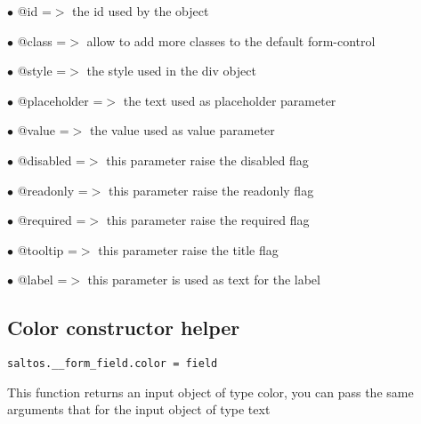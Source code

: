 \documentclass[a4paper]{book}
\begin{document}
\begin{compactitem}
\item[\color{myblue}$\bullet$] @id          =$>$ the id used by the object
\item[\color{myblue}$\bullet$] @class       =$>$ allow to add more classes to the default form-control
\item[\color{myblue}$\bullet$] @style       =$>$ the style used in the div object
\item[\color{myblue}$\bullet$] @placeholder =$>$ the text used as placeholder parameter
\item[\color{myblue}$\bullet$] @value       =$>$ the value used as value parameter
\item[\color{myblue}$\bullet$] @disabled    =$>$ this parameter raise the disabled flag
\item[\color{myblue}$\bullet$] @readonly    =$>$ this parameter raise the readonly flag
\item[\color{myblue}$\bullet$] @required    =$>$ this parameter raise the required flag
\item[\color{myblue}$\bullet$] @tooltip     =$>$ this parameter raise the title flag
\item[\color{myblue}$\bullet$] @label       =$>$ this parameter is used as text for the label
\end{compactitem}

\hypertarget{toc378}{}
\subsection{Color constructor helper}

\begin{lstlisting}
saltos.__form_field.color = field
\end{lstlisting}

This function returns an input object of type color, you can pass the same
arguments that for the input object of type text
\end{document}

